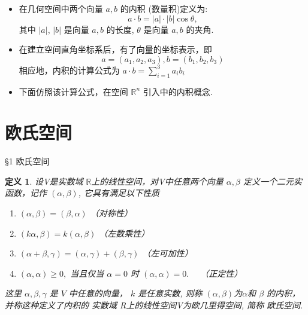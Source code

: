 \documentclass[13pt]{beamer}
\newtheorem*{defi}{定义}
\begin{document}
\begin{frame}
\begin{itemize}
	\item 
在几何空间中两个向量 $a, b$ 的内积 (数量积)定义为:
\[
a \cdot b=|a| \cdot|b| \cos \theta,
\]
其中  $|{a}|$, $| {b} |$ 是向量 $a, b$ 的长度, ${\theta}$ 是向量 ${a}, {b}$ 的夹角. 
 
 \item 
在建立空间直角坐标系后，有了向量的坐标表示，即
\[
a=\left(a_{1}, a_{2}, a_{3}\right), b=\left(b_{1}, b_{2}, b_{3}\right)
\]
相应地，内积的计算公式为 $a \cdot b=\sum_{i=1}^{3} a_{i} b_{i}$

\item 下面仿照该计算公式，在空间 $\mathbb{R}^{n}$ 引入中的内积概念. 
\end{itemize}
\end{frame}

\section{欧氏空间}
\begin{frame}{\S 1 欧氏空间}
\begin{defi}
设V是实数域 $\mathbb{R}$上的线性空间，对V中任意两个向量 $\alpha, \beta$
定义一个二元实函数，记作   $(\alpha, \beta)$, 
它具有满足以下性质
\begin{enumerate}
\item 	$(\alpha, \beta)=(\beta, \alpha)$
	（对称性）
\item 	$(k \alpha, \beta)=k(\alpha, \beta)$
	（左数乘性）
\item 	$(\alpha+\beta, \gamma)=(\alpha, \gamma)+(\beta, \gamma)$  （左可加性）
\item 	$(\alpha, \alpha) \geq {0},$ 当且仅当 $\alpha={0}$ 时 $(\alpha, \alpha)={0} . \quad$ （正定性）
\end{enumerate}
这里 $\alpha, \beta, \gamma$ 是 $V$ 中任意的向量， $k$ 是任意实数,
则称 $(\alpha, \beta)$为$\alpha$和  $\beta$  的\alert{内积}，并称这种定义了内积的
实数域 R上的线性空间V为\alert{欧几里得空间}, 简称 \alert{欧氏空间}.

\end{defi}
\end{frame}
\end{document}
